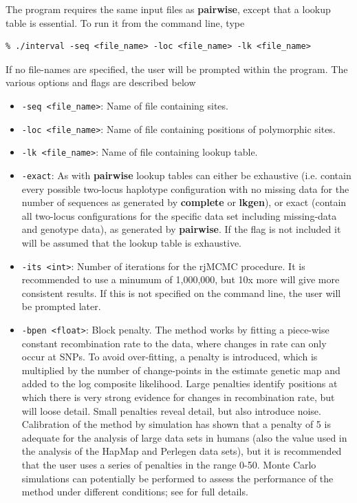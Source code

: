 \documentclass[a4paper,10pt,fullpage]{article}
\begin{document}
The program requires the same input files as {\bf pairwise},
except that a lookup table is essential.  To run it from the
command line, type\\
\begin{verbatim}
% ./interval -seq <file_name> -loc <file_name> -lk <file_name> 
\end{verbatim}
If no file-names are specified, the user will be prompted within
the program.   The various options and flags are described below
\begin{itemize}

\item \verb+-seq <file_name>+: Name of file containing sites.

\item \verb+-loc <file_name>+: Name of file containing positions of polymorphic sites.

\item \verb+-lk <file_name>+: Name of file containing lookup table.

\item \verb+-exact+:   As with {\bf pairwise} lookup
tables can either be exhaustive (i.e. contain every possible
two-locus haplotype configuration with no missing data for the
number of sequences as generated by {\bf complete} or {\bf
lkgen}), or exact (contain all two-locus configurations for the
specific data set including missing-data and genotype data), as
generated by {\bf pairwise}.  If the flag is not included it will be assumed that the lookup table is exhaustive.

\item \verb+-its <int>+: Number of iterations for the rjMCMC procedure.  It is recommended to use a minumum of 1,000,000, but 10x more will give more consistent results.  If this is not specified on the command line, the user will be prompted later.


\item \verb+-bpen <float>+: Block penalty.  The method works by fitting a piece-wise
constant recombination rate to the data, where changes in rate can
only occur at SNPs.  To avoid over-fitting, a penalty is
introduced, which is multiplied by the number of change-points in
the estimate genetic map and added to the log composite
likelihood.  Large penalties identify positions at which there is
very strong evidence for changes in recombination rate, but will
loose detail.  Small penalties reveal detail, but also introduce
noise.  Calibration of the method by simulation has shown that a
penalty of 5 is adequate for the analysis of large data sets in
humans (also the value used in the analysis of the HapMap \cite{HapMap05, HapMap07} and Perlegen \cite{Myersetal05} data sets), but it is recommended that the user uses a series of
penalties in the range 0-50.  Monte Carlo simulations can
potentially be performed 
to assess the performance of the method under different
conditions; see \cite{McVeanetal04} for full details.


\end{itemize}
\end{document}
